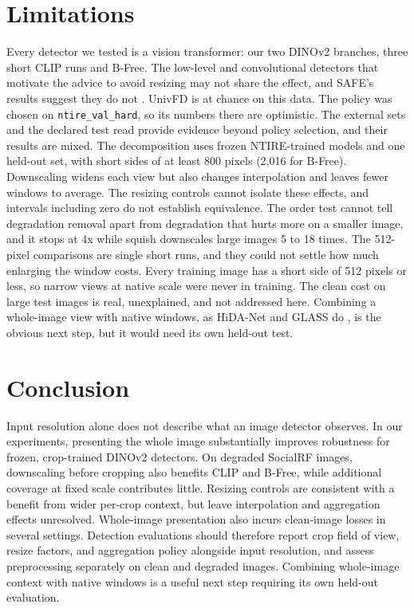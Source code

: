 \documentclass[letterpaper]{article} %
\begin{document}
\section{Limitations}

Every detector we tested is a vision transformer: our two DINOv2 branches,
three short CLIP runs and B-Free. The low-level and convolutional detectors
that motivate the advice to avoid resizing may not share the effect, and
SAFE's results suggest they do not \cite{li2025safe}. UnivFD is at chance on
this data. The policy was chosen on \texttt{ntire\_val\_hard}, so its numbers
there are optimistic. The external sets and the declared test read provide evidence beyond
policy selection, and their results are mixed. The decomposition uses frozen NTIRE-trained
models and one held-out set, with short sides of at least 800 pixels
(2,016 for B-Free). Downscaling widens each view but also changes
interpolation and leaves fewer windows to average. The resizing controls
cannot isolate these effects, and intervals including zero do not establish
equivalence. The order test cannot tell degradation removal apart from
degradation that hurts more on a smaller image, and it stops at 4x while
squish downscales large images 5 to 18 times. The 512-pixel comparisons are
single short runs, and they could not settle how much enlarging the window
costs. Every training image has a short side of 512 pixels or less, so narrow
views at native scale were never in training. The clean cost on large test
images is real, unexplained, and not addressed here. Combining a whole-image
view with native windows, as HiDA-Net and GLASS do
\cite{mu2026hidanet,han2026glass}, is the obvious next step, but it would need
its own held-out test.

\section{Conclusion}

Input resolution alone does not describe what an image detector observes.
In our experiments, presenting the whole image substantially improves
robustness for frozen, crop-trained DINOv2 detectors. On degraded SocialRF
images, downscaling before cropping also benefits CLIP and B-Free, while
additional coverage at fixed scale contributes little. Resizing controls
are consistent with a benefit from wider per-crop context, but leave
interpolation and aggregation effects unresolved. Whole-image presentation
also incurs clean-image losses in several settings. Detection evaluations
should therefore report crop field of view, resize factors, and aggregation
policy alongside input resolution, and assess preprocessing separately on
clean and degraded images. Combining whole-image context with native
windows is a useful next step requiring its own held-out evaluation.


\end{document}
